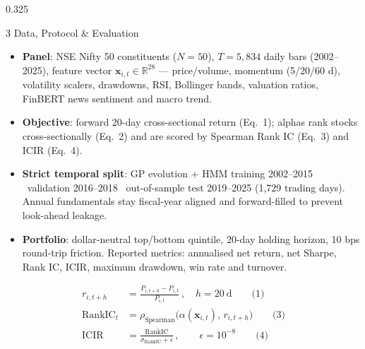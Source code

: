 \documentclass[final]{beamer}
\newcommand{\hl}[1]{\textbf{\color{navy2}#1}}
\begin{document}
\begin{frame}[t]{}
\begin{columns}[t]
\begin{column}{0.325\textwidth}
\begin{block}{3 \; Data, Protocol \& Evaluation}
\begin{itemize}
  \item \hl{Panel}: NSE Nifty 50 constituents ($N = 50$), $T = 5{,}834$ daily bars (2002--2025), feature vector $\mathbf{x}_{i,t} \in \mathbb{R}^{28}$ --- price/volume, momentum (5/20/60 d), volatility scalers, drawdowns, RSI, Bollinger bands, valuation ratios, FinBERT news sentiment and macro trend.
  \item \hl{Objective}: forward 20-day cross-sectional return (Eq.~1); alphas rank stocks cross-sectionally (Eq.~2) and are scored by Spearman Rank IC (Eq.~3) and ICIR (Eq.~4).
  \item \hl{Strict temporal split}: GP evolution + HMM training 2002--2015 \textbullet\ validation 2016--2018 \textbullet\ out-of-sample test 2019--2025 (1,729 trading days). Annual fundamentals stay fiscal-year aligned and forward-filled to prevent look-ahead leakage.
  \item \hl{Portfolio}: dollar-neutral top/bottom quintile, 20-day holding horizon, 10 bps round-trip friction. Reported metrics: annualised net return, net Sharpe, Rank IC, ICIR, maximum drawdown, win rate and turnover.
\end{itemize}
\vskip0.15cm
\begin{align*}
r_{i,t+h} &= \frac{P_{i,t+h}-P_{i,t}}{P_{i,t}}\,,\quad h=20\ \text{d} \qquad \text{(1)}\\[0.15cm]
\mathrm{RankIC}_t &= \rho_{\text{Spearman}}\big(\alpha(\mathbf{x}_{i,t}),\, r_{i,t+h}\big) \qquad \text{(3)}\\[0.15cm]
\mathrm{ICIR} &= \frac{\overline{\mathrm{RankIC}}}{\sigma_{\mathrm{RankIC}}+\epsilon}\,,\qquad \epsilon = 10^{-8} \qquad \text{(4)}
\end{align*}
\end{block}


\end{column}
\end{columns}
\end{frame}
\end{document}
